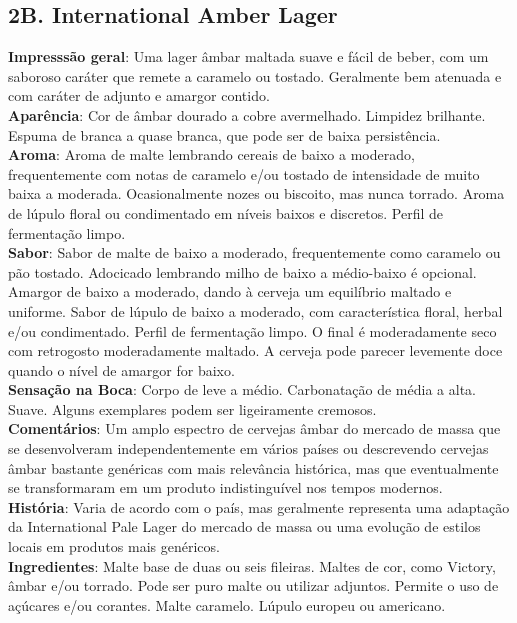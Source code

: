 \subsection*{2B. International Amber Lager}
\textbf{Impresssão geral}: Uma lager âmbar maltada suave e fácil de beber, com um saboroso caráter que remete a caramelo ou tostado. Geralmente bem atenuada e com caráter de adjunto e amargor contido. \\
\textbf{Aparência}: Cor de âmbar dourado a cobre avermelhado. Limpidez brilhante. Espuma de branca a quase branca, que pode ser de baixa persistência. \\
\textbf{Aroma}: Aroma de malte lembrando cereais de baixo a moderado, frequentemente com notas de caramelo e/ou tostado de intensidade de muito baixa a moderada. Ocasionalmente nozes ou biscoito, mas nunca torrado. Aroma de lúpulo floral ou condimentado em níveis baixos e discretos. Perfil de fermentação limpo. \\
\textbf{Sabor}: Sabor de malte de baixo a moderado, frequentemente como caramelo ou pão tostado. Adocicado lembrando milho de baixo a médio-baixo é opcional. Amargor de baixo a moderado, dando à cerveja um equilíbrio maltado e uniforme. Sabor de lúpulo de baixo a moderado, com característica floral, herbal e/ou condimentado. Perfil de fermentação limpo. O final é moderadamente seco com retrogosto moderadamente maltado. A cerveja pode parecer levemente doce quando o nível de amargor for baixo. \\
\textbf{Sensação na Boca}: Corpo de leve a médio. Carbonatação de média a alta. Suave. Alguns exemplares podem ser ligeiramente cremosos. \\
\textbf{Comentários}: Um amplo espectro de cervejas âmbar do mercado de massa que se desenvolveram independentemente em vários países ou descrevendo cervejas âmbar bastante genéricas com mais relevância histórica, mas que eventualmente se transformaram em um produto indistinguível nos tempos modernos. \\
\textbf{História}: Varia de acordo com o país, mas geralmente representa uma adaptação da International Pale Lager do mercado de massa ou uma evolução de estilos locais em produtos mais genéricos. \\
\textbf{Ingredientes}: Malte base de duas ou seis fileiras. Maltes de cor, como Victory, âmbar e/ou torrado. Pode ser puro malte ou utilizar adjuntos. Permite o uso de açúcares e/ou corantes. Malte caramelo. Lúpulo europeu ou americano. \\
